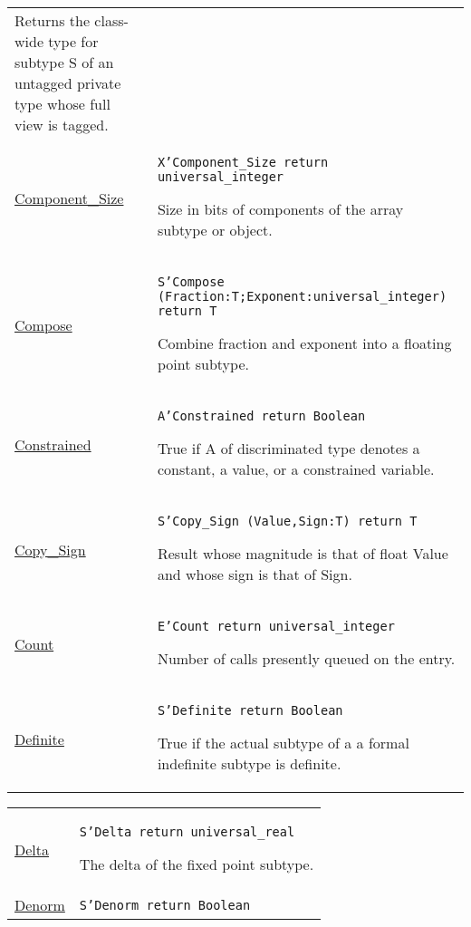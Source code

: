 \documentclass[english]{article}
\begin{document}
\begin{scriptsize}
\begin{multicols*}{3}
\begin{tabular}{@{}p{2cm}p{6.5cm}}
   Returns the class-wide type for subtype S of an untagged private type whose full view is tagged.\\

   \href{http://www.ada-auth.org/standards/22rm/html/RM-K-2.html}{Component\_Size} & \texttt{X'Component\_Size return universal\_integer}

   Size in bits of components of the array subtype or object.\\

   \href{http://www.ada-auth.org/standards/22rm/html/RM-K-2.html}{Compose} & \texttt{S'Compose (Fraction:T;Exponent:universal\_integer) return T}

   Combine fraction and exponent into a floating point subtype.\\

   \href{http://www.ada-auth.org/standards/22rm/html/RM-K-2.html}{Constrained} & \texttt{A'Constrained return Boolean}

   True if A of discriminated type denotes a constant, a value, or a constrained variable.\\

   \href{http://www.ada-auth.org/standards/22rm/html/RM-K-2.html}{Copy\_Sign} & \texttt{S'Copy\_Sign (Value,Sign:T) return T}

   Result whose magnitude is that of float Value and whose sign is that of Sign.\\

   \href{http://www.ada-auth.org/standards/22rm/html/RM-K-2.html}{Count} & \texttt{E'Count return universal\_integer}

   Number of calls presently queued on the entry.\\

   \href{http://www.ada-auth.org/standards/22rm/html/RM-K-2.html}{Definite} & \texttt{S'Definite return Boolean}

   True if the actual subtype of a a formal indefinite subtype is definite.\\

\end{tabular}
\begin{tabular}{@{}p{2cm}p{6.5cm}}

   \href{http://www.ada-auth.org/standards/22rm/html/RM-K-2.html}{Delta} & \texttt{S'Delta return universal\_real}

   The delta of the fixed point subtype.\\

   \href{http://www.ada-auth.org/standards/22rm/html/RM-K-2.html}{Denorm} & \texttt{S'Denorm return Boolean}


\end{tabular}
\end{multicols*}
\end{scriptsize}
\end{document}
